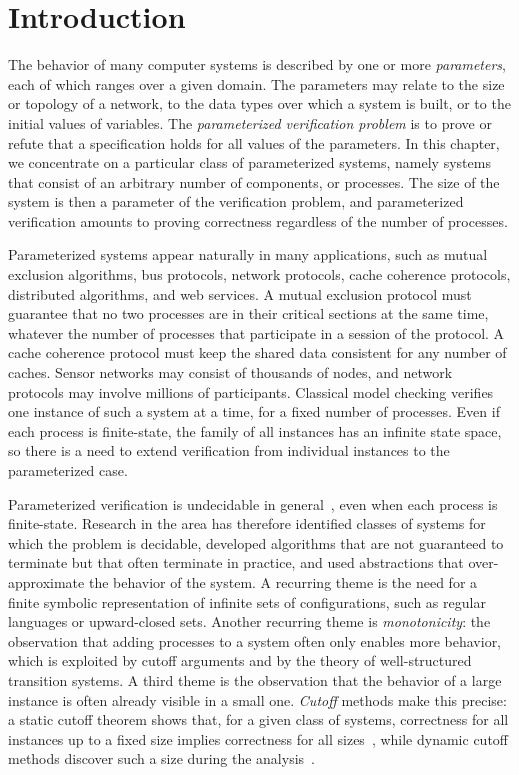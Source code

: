 \section{Introduction}
\label{sec:intro}

The behavior of many computer systems is described by one or more
\emph{parameters}, each of which ranges over a given domain. The parameters may
relate to the size or topology of a network, to the data types over which a
system is built, or to the initial values of variables. The
\emph{parameterized verification problem} is to prove or refute that a
specification holds for all values of the parameters. In this chapter, we
concentrate on a particular class of parameterized systems, namely systems that
consist of an arbitrary number of components, or processes. The size of the
system is then a parameter of the verification problem, and parameterized
verification amounts to proving correctness regardless of the number of
processes.

Parameterized systems appear naturally in many applications, such as mutual
exclusion algorithms, bus protocols, network protocols, cache coherence
protocols, distributed algorithms, and web services. A mutual exclusion
protocol must guarantee that no two processes are in their critical sections at
the same time, whatever the number of processes that participate in a session
of the protocol. A cache coherence protocol must keep the shared data
consistent for any number of caches. Sensor networks may consist of thousands
of nodes, and network protocols may involve millions of participants. Classical
model checking verifies one instance of such a system at a time, for a fixed
number of processes. Even if each process is finite-state, the family of all
instances has an infinite state space, so there is a need to extend
verification from individual instances to the parameterized case.

Parameterized verification is undecidable in general~\cite{AK86,Suz88}, even
when each process is finite-state. Research in the area has therefore
identified classes of systems for which the problem is decidable, developed
algorithms that are not guaranteed to terminate but that often terminate in
practice, and used abstractions that over-approximate the behavior of the
system. A recurring theme is the need for a finite symbolic representation of
infinite sets of configurations, such as regular languages or upward-closed
sets. Another recurring theme is \emph{monotonicity}: the observation that
adding processes to a system often only enables more behavior, which is
exploited by cutoff arguments and by the theory of well-structured transition
systems. A third theme is the observation that the behavior of a large instance
is often already visible in a small one. \emph{Cutoff} methods make this
precise: a static cutoff theorem shows that, for a given class of systems,
correctness for all instances up to a fixed size implies correctness for all
sizes~\cite{EN95,EK00}, while dynamic cutoff methods discover such a size
during the analysis~\cite{AHH16,KKW10}.

